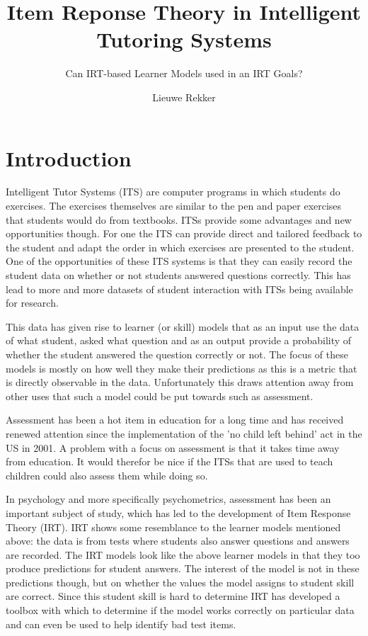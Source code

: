 \documentclass{scrartcl}
\begin{document}
 
\title{Item Reponse Theory in Intelligent Tutoring Systems}
\subtitle{Can IRT-based Learner Models used in an IRT Goals?}

\author{Lieuwe Rekker}
\maketitle
\nocite{labelcombi}
\nocite{lftransfer}
\nocite{importance}
\nocite{knowledgeproblem}
\nocite{modelreview}
\nocite{eirt}
\nocite{pfa}
\nocite{ktpfa}
\nocite{skillcombi}
\nocite{lfa}
\nocite{blackart}
\nocite{hambleton}
\nocite{bridge}
\nocite{ct}
\nocite{algebra}
\nocite{assessment}


\section{Introduction}
Intelligent Tutor Systems (ITS) are computer programs in which students do exercises. The exercises themselves are similar to the pen and paper exercises that students would do from textbooks. ITSs provide some advantages and new opportunities though. For one the ITS can provide direct and tailored feedback to the student and adapt the order in which exercises are presented to the student. One of the opportunities of these ITS systems is that they can easily record the student data on whether or not students answered questions correctly. This has lead to more and more datasets of student interaction with ITSs being available for research.

This data has given rise to learner (or skill) models that as an input use the data of what student, asked what question and as an output provide a probability of whether the student answered the question correctly or not. The focus of these models is mostly on how well they make their predictions as this is a metric that is directly observable in the data. Unfortunately this draws attention away from other uses that such a model could be put towards such as assessment.

Assessment has been a hot item in education for a long time and has received renewed attention since the implementation of the 
'no child left behind' act in the US in 2001. A problem with a focus on assessment is that it takes time away from education. It would therefor be nice if the ITSs that are used to teach children could also assess them while doing so.

In psychology and more specifically psychometrics, assessment has been an important subject of study, which has led to the development of Item Response Theory (IRT). IRT shows some resemblance to the learner models mentioned above: the data is from tests where students also answer questions and answers are recorded. The IRT models look like the above learner models in that they too produce predictions for student answers. The interest of the model is not in these predictions though, but on whether the values the model assigns to student skill are correct. Since this student skill is hard to determine IRT has developed a toolbox with which to determine if the model works correctly on particular data and can even be used to help identify bad test items. 
\end{document}
